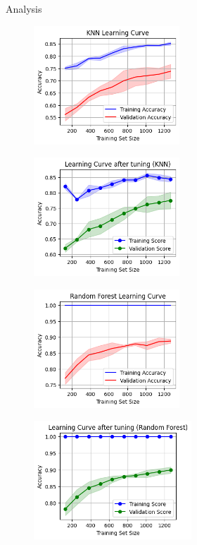 \documentclass[14pt, aspectratio=169]{beamer}
\begin{document}
\begin{frame}[allowframebreaks]{Analysis}
\begin{adjustwidth}{-0.75cm}{1.25cm}
  \begin{figure}[H]
    \centering
    \begin{minipage}{0.45\textwidth}
        \centering
        \includegraphics[height=12em]{../report/lc_KNN.png}
        \label{lc_KNN}
    \end{minipage}
    \hfill
    \begin{minipage}{0.45\textwidth}
        \centering
        \includegraphics[height=12em]{../report/lc_tuned_KNN.png}
        \label{lc_tuned_KNN}
    \end{minipage}
  \end{figure}
  
  \begin{figure}[H]
    \centering
    \begin{minipage}{0.45\textwidth}
        \centering
        \includegraphics[height=12em]{../report/lc_RF.png}
        \label{lc_RF}
    \end{minipage}
    \hfill
    \begin{minipage}{0.45\textwidth}
        \centering
        \includegraphics[height=12em]{../report/lc_tuned_RF.png}
        \label{lc_tuned_RF}
    \end{minipage}
  \end{figure}
  

\end{adjustwidth}
\end{frame}
\end{document}
